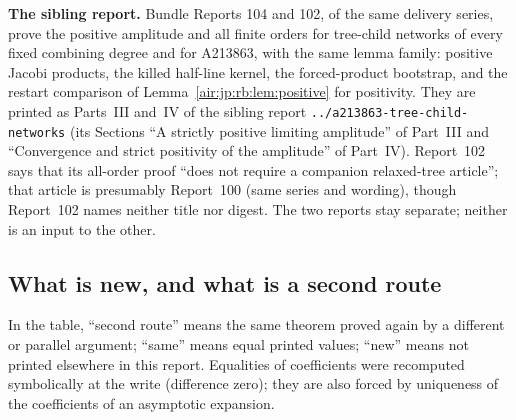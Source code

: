 \documentclass[11pt,letterpaper]{article}
\numberwithin{equation}{section}
\theoremstyle{remark}
\newcommand{\repopath}[1]{\nolinkurl{#1}}
\begin{document}
\textbf{The sibling report.} Bundle Reports 104 and 102, of the same delivery series, prove the positive amplitude and all finite orders for tree-child networks of every fixed combining degree and for A213863, with the same lemma family: positive Jacobi products, the killed half-line kernel, the forced-product bootstrap, and the restart comparison of Lemma~\ref{air:jp:rb:lem:positive} for positivity. They are printed as Parts~III and~IV of the sibling report \repopath{../a213863-tree-child-networks} (its Sections ``A strictly positive limiting amplitude'' of Part~III and ``Convergence and strict positivity of the amplitude'' of Part~IV). Report~102 says that its all-order proof ``does not require a companion relaxed-tree article''; that article is presumably Report~100 (same series and wording), though Report~102 names neither title nor digest. The two reports stay separate; neither is an input to the other.

\subsection{What is new, and what is a second route}\label{air:jp:sec:map}
In the table, ``second route'' means the same theorem proved again by a different or parallel argument; ``same'' means equal printed values; ``new'' means not printed elsewhere in this report. Equalities of coefficients were recomputed symbolically at the write (difference zero); they are also forced by uniqueness of the coefficients of an asymptotic expansion.
\end{document}
